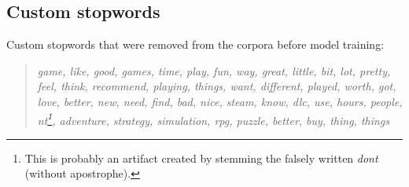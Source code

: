 \documentclass[11pt, a4paper]{article}
\newenvironment{itquote}
  {\begin{quote}\itshape}
  {\end{quote}\ignorespacesafterend}
\begin{document}
\begin{appendices}
\section{Custom stopwords}\label{sec:stops}
Custom stopwords that were removed from the corpora before model training:
\begin{itquote}
    game, like, good, games, time, play, fun, way, great, little, bit, lot, pretty, feel, think, recommend, playing,
    things, want, different, played, worth, got, love, better, new, need, find, bad, nice, steam, know, dlc, use, hours,
    people, nt\footnote{This is probably an artifact created by stemming the falsely written \textit{dont} (without
    apostrophe).}, adventure, strategy, simulation, rpg, puzzle, better, buy, thing, things
\end{itquote}
\end{appendices}
\end{document}

